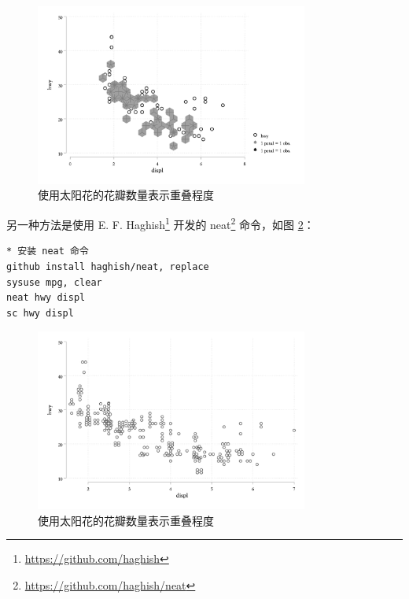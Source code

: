 \documentclass[]{ctexbook}
\renewcommand{\href}[2]{#2\footnote{\url{#1}}}
\begin{document}
\begin{figure}

{\centering \includegraphics[width=0.8\textwidth]{assets/sunflower} 

}

\caption{使用太阳花的花瓣数量表示重叠程度}\label{fig:sunflower}
\end{figure}

另一种方法是使用 \href{https://github.com/haghish}{E. F. Haghish} 开发的 \href{https://github.com/haghish/neat}{neat} 命令，如图 \ref{fig:neatscatter}：

\begin{lstlisting}
* 安装 neat 命令
github install haghish/neat, replace
sysuse mpg, clear
neat hwy displ
sc hwy displ
\end{lstlisting}

\begin{figure}

{\centering \includegraphics[width=0.8\textwidth]{assets/neatscatter} 

}

\caption{使用太阳花的花瓣数量表示重叠程度}\label{fig:neatscatter}
\end{figure}
\end{document}

